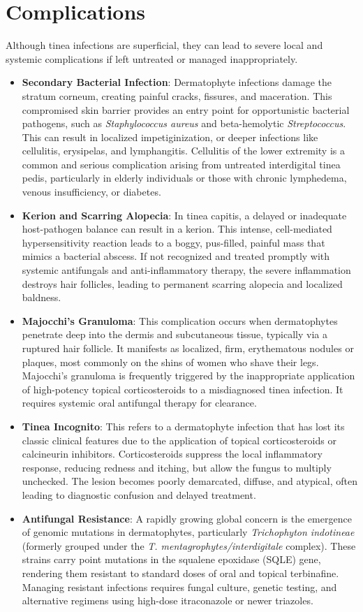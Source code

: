 \section*{Complications}
Although tinea infections are superficial, they can lead to severe local and systemic complications if left untreated or managed inappropriately.
\begin{itemize}
    \item \textbf{Secondary Bacterial Infection}: Dermatophyte infections damage the stratum corneum, creating painful cracks, fissures, and maceration. This compromised skin barrier provides an entry point for opportunistic bacterial pathogens, such as \textit{Staphylococcus aureus} and beta-hemolytic \textit{Streptococcus}. This can result in localized impetiginization, or deeper infections like cellulitis, erysipelas, and lymphangitis. Cellulitis of the lower extremity is a common and serious complication arising from untreated interdigital tinea pedis, particularly in elderly individuals or those with chronic lymphedema, venous insufficiency, or diabetes.
    \item \textbf{Kerion and Scarring Alopecia}: In tinea capitis, a delayed or inadequate host-pathogen balance can result in a kerion. This intense, cell-mediated hypersensitivity reaction leads to a boggy, pus-filled, painful mass that mimics a bacterial abscess. If not recognized and treated promptly with systemic antifungals and anti-inflammatory therapy, the severe inflammation destroys hair follicles, leading to permanent scarring alopecia and localized baldness.
    \item \textbf{Majocchi's Granuloma}: This complication occurs when dermatophytes penetrate deep into the dermis and subcutaneous tissue, typically via a ruptured hair follicle. It manifests as localized, firm, erythematous nodules or plaques, most commonly on the shins of women who shave their legs. Majocchi's granuloma is frequently triggered by the inappropriate application of high-potency topical corticosteroids to a misdiagnosed tinea infection. It requires systemic oral antifungal therapy for clearance.
    \item \textbf{Tinea Incognito}: This refers to a dermatophyte infection that has lost its classic clinical features due to the application of topical corticosteroids or calcineurin inhibitors. Corticosteroids suppress the local inflammatory response, reducing redness and itching, but allow the fungus to multiply unchecked. The lesion becomes poorly demarcated, diffuse, and atypical, often leading to diagnostic confusion and delayed treatment.
    \item \textbf{Antifungal Resistance}: A rapidly growing global concern is the emergence of genomic mutations in dermatophytes, particularly \textit{Trichophyton indotineae} (formerly grouped under the \textit{T. mentagrophytes/interdigitale} complex). These strains carry point mutations in the squalene epoxidase (SQLE) gene, rendering them resistant to standard doses of oral and topical terbinafine. Managing resistant infections requires fungal culture, genetic testing, and alternative regimens using high-dose itraconazole or newer triazoles.
\end{itemize}

